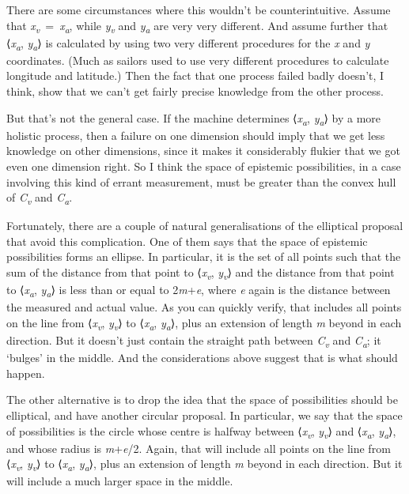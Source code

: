\documentclass[
  11pt,
  letterpaper,
  DIV=11,
  numbers=noendperiod,
  twoside]{scrartcl}
\begin{document}
There are some circumstances where this wouldn't be counterintuitive.
Assume that \emph{x\textsubscript{v}}~=~\emph{x\textsubscript{a}}, while
\emph{y\textsubscript{v}} and \emph{y\textsubscript{a}} are very very
different. And assume further that ⟨\emph{x\textsubscript{a}},
\emph{y\textsubscript{a}}⟩ is calculated by using two very different
procedures for the \emph{x} and \emph{y} coordinates. (Much as sailors
used to use very different procedures to calculate longitude and
latitude.) Then the fact that one process failed badly doesn't, I think,
show that we can't get fairly precise knowledge from the other process.

But that's not the general case. If the machine determines
⟨\emph{x\textsubscript{a}}, \emph{y\textsubscript{a}}⟩ by a more
holistic process, then a failure on one dimension should imply that we
get less knowledge on other dimensions, since it makes it considerably
flukier that we got even one dimension right. So I think the space of
epistemic possibilities, in a case involving this kind of errant
measurement, must be greater than the convex hull of
\emph{C\textsubscript{v}} and \emph{C\textsubscript{a}}.

Fortunately, there are a couple of natural generalisations of the
elliptical proposal that avoid this complication. One of them says that
the space of epistemic possibilities forms an ellipse. In particular, it
is the set of all points such that the sum of the distance from that
point to ⟨\emph{x\textsubscript{v}}, \emph{y\textsubscript{v}}⟩ and the
distance from that point to ⟨\emph{x\textsubscript{a}},
\emph{y\textsubscript{a}}⟩ is less than or equal to 2\emph{m}+\emph{e},
where \emph{e} again is the distance between the measured and actual
value. As you can quickly verify, that includes all points on the line
from ⟨\emph{x\textsubscript{v}}, \emph{y\textsubscript{v}}⟩ to
⟨\emph{x\textsubscript{a}}, \emph{y\textsubscript{a}}⟩, plus an
extension of length \emph{m} beyond in each direction. But it doesn't
just contain the straight path between \emph{C\textsubscript{v}} and
\emph{C\textsubscript{a}}; it `bulges' in the middle. And the
considerations above suggest that is what should happen.

The other alternative is to drop the idea that the space of
possibilities should be elliptical, and have another circular proposal.
In particular, we say that the space of possibilities is the circle
whose centre is halfway between ⟨\emph{x\textsubscript{v}},
\emph{y\textsubscript{v}}⟩ and ⟨\emph{x\textsubscript{a}},
\emph{y\textsubscript{a}}⟩, and whose radius is \emph{m}+\emph{e}/2.
Again, that will include all points on the line from
⟨\emph{x\textsubscript{v}}, \emph{y\textsubscript{v}}⟩ to
⟨\emph{x\textsubscript{a}}, \emph{y\textsubscript{a}}⟩, plus an
extension of length \emph{m} beyond in each direction. But it will
include a much larger space in the middle.
\end{document}
